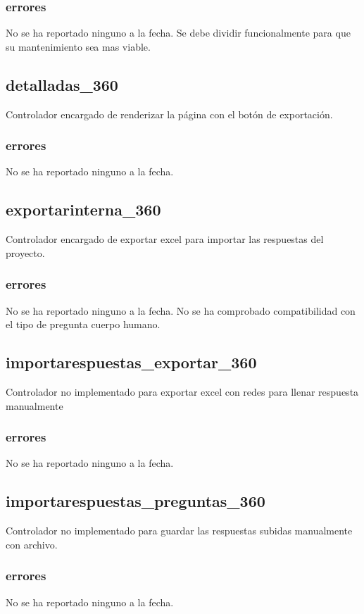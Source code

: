 \documentclass[10pt,a4paper]{book}
\begin{document}
	\subsubsection{errores}
	No se ha reportado ninguno a la fecha. Se debe dividir funcionalmente para que su mantenimiento sea mas viable.
	
	\subsection{detalladas\_360}
	Controlador encargado de renderizar la página con el botón de exportación.
	\subsubsection{errores}
	No se ha reportado ninguno a la fecha.
	
	\subsection{exportarinterna\_360}
	Controlador encargado de exportar excel para importar las respuestas del proyecto.
	\subsubsection{errores}
	No se ha reportado ninguno a la fecha. No se ha comprobado compatibilidad con el tipo de pregunta cuerpo humano.
	
	\subsection{importarespuestas\_exportar\_360}
	Controlador no implementado para exportar excel con redes para llenar respuesta manualmente
	\subsubsection{errores}
	No se ha reportado ninguno a la fecha.
	
	\subsection{importarespuestas\_preguntas\_360}
	Controlador no implementado para guardar las respuestas subidas manualmente con archivo. 
	\subsubsection{errores}
	No se ha reportado ninguno a la fecha.
	
\end{document}
